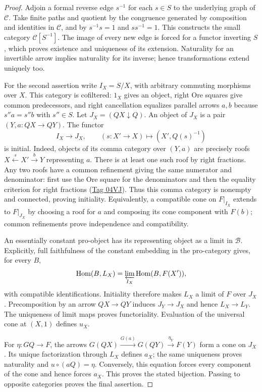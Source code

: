 \begin{proof}
Adjoin a formal reverse edge $s^{-1}$ for each $s\in S$ to the underlying
graph of $\mathcal C$. Take finite paths and quotient by the congruence
generated by composition and identities in $\mathcal C$, and by
$s^{-1}s=1$ and $ss^{-1}=1$. This constructs the small category
$\mathcal C[S^{-1}]$. The image of every new edge is forced for a functor
inverting $S$, which proves existence and uniqueness of its extension.
Naturality for an invertible arrow implies naturality for its inverse;
hence transformations extend uniquely too.

For the second assertion write $I_X=S/X$, with arbitrary commuting
morphisms over $X$. This category is cofiltered: $1_X$ gives an object,
right Ore squares give common predecessors, and right cancellation
equalizes parallel arrows $a,b$ because $s''a=s''b$ with $s''\in S$.
Let $J_X=(QX\downarrow Q)$. An object of $J_X$
is a pair $(Y,a:QX\to QY)$. The functor
\[
 I_X\longrightarrow J_X,\qquad
 (s:X'\to X)\longmapsto (X',Q(s)^{-1})
\]
is initial. Indeed, objects of its comma category over $(Y,a)$ are precisely
roofs $X\xleftarrow{s}X'\xrightarrow{b}Y$ representing $a$.
There is at least one such roof by right fractions. Any two roofs have a
common refinement giving the same numerator and denominator: first use the
Ore square for the denominators and then the equality criterion for right
fractions (\href{https://stacks.math.columbia.edu/tag/04VJ}{Tag 04VJ}).
Thus this comma category is nonempty and connected, proving initiality.
Equivalently, a compatible cone on $F|_{I_X}$ extends to $F|_{J_X}$ by
choosing a roof for $a$ and composing its cone component with $F(b)$;
common refinements prove independence and compatibility.

An essentially constant pro-object has its representing object as a limit
in $\mathcal B$. Explicitly, full faithfulness of the constant embedding
in the pro-category gives, for every $B$,
\[
 \operatorname{Hom}(B,L_X)
 =\varprojlim_{I_X}\operatorname{Hom}(B,F(X')),
\]
with compatible identifications. Initiality therefore makes $L_X$ a limit
of $F$ over $J_X$. Precomposition by an arrow $QX\to QY$ induces
$J_Y\to J_X$ and hence $L_X\to L_Y$. The uniqueness of limit maps proves
functoriality. Evaluation of the universal cone at $(X,1)$ defines $u_X$.

For $\eta:GQ\to F$, the arrows
$G(QX)\xrightarrow{G(a)}G(QY)\xrightarrow{\eta_Y}F(Y)$
form a cone on $J_X$. Its unique factorization through $L_X$ defines $a_X$;
the same uniqueness proves naturality and $u\circ(aQ)=\eta$.
Conversely, this equation forces every component of the cone and hence
forces $a_X$. This proves the stated bijection. Passing to opposite
categories proves the final assertion.
\end{proof}

